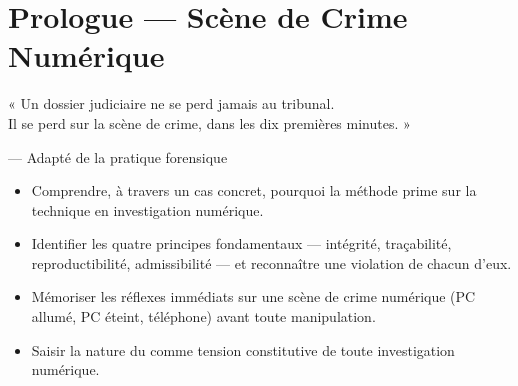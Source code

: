 %

\chapter{Prologue --- Scène de Crime Numérique}
\label{chap:prologue}

\epigraph{%
    « Un dossier judiciaire ne se perd jamais au tribunal.\\
    Il se perd sur la scène de crime, dans les dix premières minutes. »%
}{--- Adapté de la pratique forensique}


\begin{boxobjectifs}
\begin{itemize}
    \item Comprendre, à travers un cas concret, pourquoi la méthode prime
          sur la technique en investigation numérique.
    \item Identifier les quatre principes fondamentaux --- intégrité,
          traçabilité, reproductibilité, admissibilité --- et reconnaître
          une violation de chacun d'eux.
    \item Mémoriser les réflexes immédiats sur une scène de crime numérique
          (PC allumé, PC éteint, téléphone) avant toute manipulation.
    \item Saisir la nature du  comme tension
          constitutive de toute investigation numérique.
\end{itemize}
\end{boxobjectifs}

\bigskip


